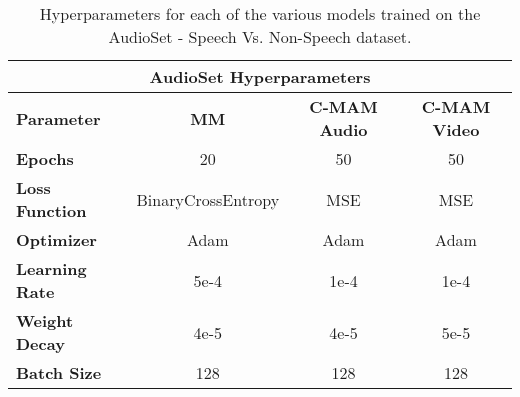 \FloatBarrier
\begin{table}[h!]
\footnotesize
\centering
\caption{Hyperparameters for each of the various models trained on the AudioSet - Speech Vs. Non-Speech dataset.}
\label{tab:sns_hyp}
\begin{tabular}{lccc}
\hline
\multicolumn{4}{c}{\textbf{AudioSet Hyperparameters}}            \\ \hline
\multicolumn{1}{l|}{\textbf{Parameter}}     & \textbf{MM}        & \textbf{C-MAM Audio} & \textbf{C-MAM Video} \\ \hline
\multicolumn{1}{l|}{\textbf{Epochs}}        & 20   & 50   & 50   \\
\multicolumn{1}{l|}{\textbf{Loss Function}} & BinaryCrossEntropy & MSE                  & MSE                  \\
\multicolumn{1}{l|}{\textbf{Optimizer}}     & Adam & Adam & Adam \\
\multicolumn{1}{l|}{\textbf{Learning Rate}} & 5e-4 & 1e-4 & 1e-4 \\
\multicolumn{1}{l|}{\textbf{Weight Decay}}  & 4e-5 & 4e-5 & 5e-5 \\
\multicolumn{1}{l|}{\textbf{Batch Size}}    & 128  & 128  & 128  \\ \hline
\end{tabular}%
\end{table}


